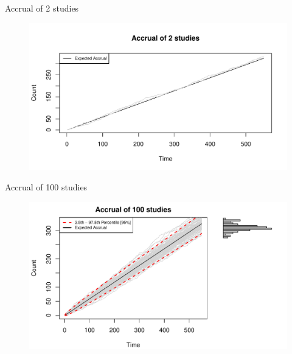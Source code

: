 \documentclass[english]{beamer}\usepackage[]{graphicx}\usepackage[]{xcolor}
\makeatletter
\def\maxwidth{ %
  \ifdim\Gin@nat@width>\linewidth
    \linewidth
  \else
    \Gin@nat@width
  \fi
}
\newenvironment{knitrout}{}{} %
\makeatother
\begin{document}
\begin{frame}{Accrual of 2 studies}

\begin{figure}

\begin{knitrout}
\color{fgcolor}
\includegraphics[width=\maxwidth]{figures/figunnamed-chunk-3-1} 
\end{knitrout}
  
\end{figure}


\end{frame}

\begin{frame}{Accrual of 100 studies}

\begin{figure}
\begin{knitrout}
\color{fgcolor}
\includegraphics[width=\maxwidth]{figures/figunnamed-chunk-4-1} 
\end{knitrout}

\end{figure}

\end{frame}
\end{document}
